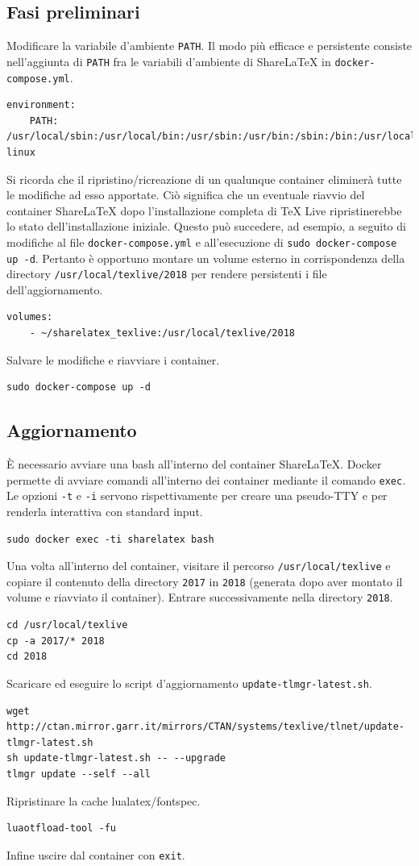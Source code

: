 \subsection{Fasi preliminari}
Modificare la variabile d'ambiente \verb|PATH|. Il modo più efficace e persistente consiste nell'aggiunta di \verb|PATH| fra le variabili d'ambiente di ShareLaTeX in \verb|docker-compose.yml|.
\begin{lstlisting}
environment:
    PATH: /usr/local/sbin:/usr/local/bin:/usr/sbin:/usr/bin:/sbin:/bin:/usr/local/texlive/2018/bin/x86_64-linux
\end{lstlisting}
Si ricorda che il ripristino/ricreazione di un qualunque container eliminerà tutte le modifiche ad esso apportate. Ciò significa che un eventuale riavvio del container ShareLaTeX dopo l'installazione completa di TeX Live ripristinerebbe lo stato dell'installazione iniziale. Questo può succedere, ad esempio, a seguito di modifiche al file \verb|docker-compose.yml| e all'esecuzione di \verb|sudo docker-compose up -d|. Pertanto è opportuno montare un volume esterno in corrispondenza della directory \verb|/usr/local/texlive/2018| per rendere persistenti i file dell'aggiornamento.
\begin{lstlisting}
volumes:
    - ~/sharelatex_texlive:/usr/local/texlive/2018
\end{lstlisting}
Salvare le modifiche e riavviare i container.
\begin{lstlisting}
sudo docker-compose up -d
\end{lstlisting}

\subsection{Aggiornamento}
È necessario avviare una bash all'interno del container ShareLaTeX. Docker permette di avviare comandi all'interno dei container mediante il comando \verb|exec|. Le opzioni \verb|-t| e \verb|-i| servono rispettivamente per creare una pseudo-TTY e per renderla interattiva con standard input.
\begin{lstlisting}
sudo docker exec -ti sharelatex bash
\end{lstlisting}
Una volta all'interno del container, visitare il percorso \verb|/usr/local/texlive| e copiare il contenuto della directory \verb|2017| in \verb|2018| (generata dopo aver montato il volume e riavviato il container). Entrare successivamente nella directory \verb|2018|.
\begin{lstlisting}
cd /usr/local/texlive
cp -a 2017/* 2018
cd 2018
\end{lstlisting}
Scaricare ed eseguire lo script d'aggiornamento \verb|update-tlmgr-latest.sh|.
\begin{lstlisting}
wget http://ctan.mirror.garr.it/mirrors/CTAN/systems/texlive/tlnet/update-tlmgr-latest.sh
sh update-tlmgr-latest.sh -- --upgrade
tlmgr update --self --all
\end{lstlisting}
Ripristinare la cache lualatex/fontspec.
\begin{lstlisting}
luaotfload-tool -fu
\end{lstlisting}
Infine uscire dal container con \verb|exit|.

